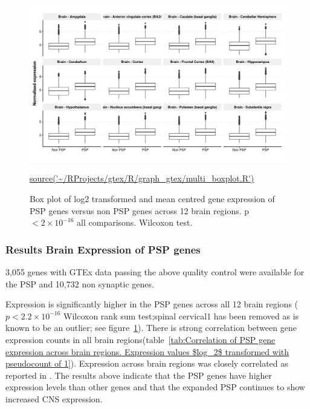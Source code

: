 \begin{figure}
    \centering
    \includegraphics[width=\textwidth]{images/chapter2/ggplot/gtex/Rplot_boxplot_expression_add_theme.png}
    \caption{Box plot of log2 transformed and mean centred gene expression of PSP genes versus non PSP genes across 12 brain regions. p $< 2 \times 10^{-16}$ all comparisons. Wilcoxon test.}
    \tiny\url{source('~/RProjects/gtex/R/graph_gtex/multi_boxplot.R')}
    \label{fig:gtex_boxplot}
\end{figure}




\subsubsection{Results Brain Expression of PSP genes}
\label{sec:gtex_results}
3,055 genes with GTEx data passing the above quality control were available for the PSP and 10,732 non synaptic genes. 

Expression is significantly higher in the PSP genes across all 12 brain regions ($p<2.2\times10^{-16}$ Wilcoxon rank sum test;spinal cervical1 has been removed as is known to be an outlier; see figure~\ref{fig:gtex_boxplot}).  There is strong correlation between gene expression counts in all brain regions(table~\ref{tab:Correlation of PSP gene expression across brain regions. Expression values $log_2$ transformed with pseudocount of 1}). Expression across brain regions was closely correlated as reported in \cite{gtex2015genotype}. The results above indicate that the PSP genes have higher expression levels than other genes and that the expanded PSP continues to show increased CNS expression. 

